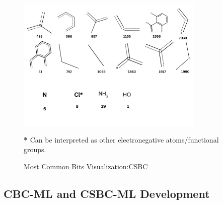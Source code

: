 \begin{figure}[h]
	\centering
	\begin{minipage}{\textwidth}
		\centering
		\includegraphics[width=0.8\textwidth]{mostcommonbitv2.png}
		\vspace{-0.3cm}
		
		\parbox{\textwidth}{\centering \footnotesize \textbf{*} Can be interpreted as other electronegative atoms/functional groups.}
		
		\vspace{0.3cm}
		\caption{Most Common Bits Visualization:CSBC}
		\label{fig:mostcombits}
	\end{minipage}
\end{figure}
\FloatBarrier
\subsection*{CBC-ML and CSBC-ML Development} 

